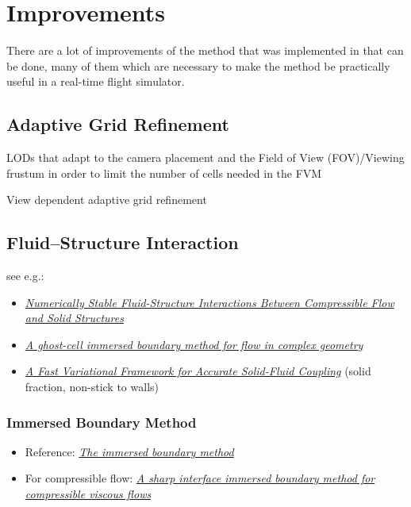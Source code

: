 \chapter{Improvements}

There are a lot of improvements of the method that was implemented in \thisprojectwork that can be done, many of them which are necessary  to make the method be practically useful in a real-time flight simulator.

\section{Adaptive Grid Refinement}

LODs that adapt to the camera placement and the Field of View (FOV)/Viewing frustum in order to limit the number of cells needed in the FVM

View dependent adaptive grid refinement

\section{Fluid--Structure Interaction}

see e.g.:

\begin{itemize}
    \item \textit{\href{http://physbam.stanford.edu/~fedkiw/papers/stanford2010-04.pdf}{Numerically Stable Fluid-Structure Interactions Between Compressible Flow and Solid Structures}}
    \item \textit{\href{http://efdl.as.ntu.edu.tw/research/papers/JCP03GCIBM.pdf}{A ghost-cell immersed boundary method for flow in complex geometry}}
    \item \textit{\href{http://www.cs.columbia.edu/~batty/papers/Batty07.pdf}{A Fast Variational Framework for Accurate Solid-Fluid Coupling}} (solid fraction, non-stick to walls)
\end{itemize}

\subsection{Immersed Boundary Method}

\begin{itemize}
    \item Reference: \textit{\href{http://www4.ncsu.edu/~zhilin/TEACHING/MA798Z/Peskin1.pdf}{The immersed boundary method}}
    \item For compressible flow: \textit{\href{http://www.cecs.wright.edu/~haibo.dong/wp-content/themes/publications/IBM_JCP_2007.pdf}{A sharp interface immersed boundary method for compressible viscous flows}}
\end{itemize}

